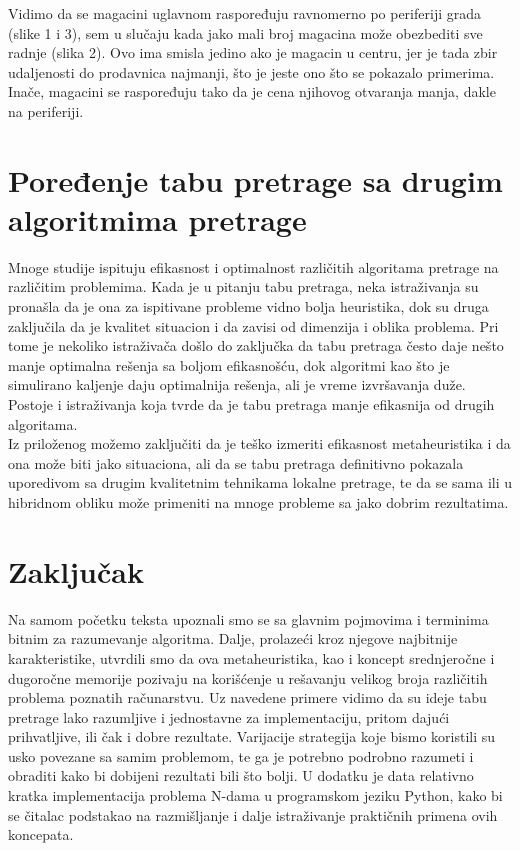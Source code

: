 \documentclass[a4paper]{article}
\begin{document}
Vidimo da se magacini uglavnom raspoređuju ravnomerno po periferiji grada (slike 1 i 3), sem u slučaju kada jako mali broj magacina može obezbediti sve radnje (slika 2). Ovo ima smisla jedino ako je magacin u centru, jer je tada zbir udaljenosti do prodavnica najmanji, što je jeste ono što se pokazalo primerima. Inače, magacini se raspoređuju tako da je cena njihovog otvaranja manja, dakle na periferiji.

\section{Poređenje tabu pretrage sa drugim algoritmima pretrage}
Mnoge studije ispituju efikasnost i optimalnost različitih algoritama pretrage na različitim problemima. Kada je u pitanju tabu pretraga, neka istraživanja su pronašla da je ona za ispitivane probleme vidno bolja heuristika, \cite{comptabubetter} dok su druga zaključila da je kvalitet situacion i da zavisi od dimenzija i oblika problema. \cite{comptabusimilar}\cite{comptabugoodperformance} Pri tome je nekoliko istraživača došlo do zaključka da tabu pretraga često daje nešto manje optimalna rešenja sa boljom efikasnošću, dok algoritmi kao što je simulirano kaljenje daju optimalnija rešenja, ali je vreme izvršavanja duže. \cite{comptabubettertimeworseresult} Postoje i istraživanja koja tvrde da je tabu pretraga manje efikasnija od drugih algoritama. \cite{comptabuworse}\\

Iz priloženog možemo zaključiti da je teško izmeriti efikasnost metaheuristika i da ona može biti jako situaciona, ali da se tabu pretraga definitivno pokazala uporedivom sa drugim kvalitetnim tehnikama lokalne pretrage, te da se sama ili u hibridnom obliku može primeniti na mnoge probleme sa jako dobrim rezultatima.

\newpage

\section{Zaključak}
Na samom početku teksta upoznali smo se sa glavnim pojmovima i terminima bitnim za razumevanje algoritma. Dalje, prolazeći kroz njegove najbitnije karakteristike, utvrdili smo da ova metaheuristika, kao i koncept srednjeročne i dugoročne memorije pozivaju na korišćenje u rešavanju velikog broja različitih problema poznatih računarstvu. Uz navedene primere vidimo da su ideje tabu pretrage lako razumljive i jednostavne za implementaciju, pritom dajući prihvatljive, ili čak i dobre rezultate. Varijacije strategija koje bismo koristili su usko povezane sa samim problemom, te ga je potrebno podrobno razumeti i obraditi kako bi dobijeni rezultati bili što bolji. U dodatku je data relativno kratka implementacija problema N-dama u programskom jeziku Python, kako bi se čitalac podstakao na razmišljanje i dalje istraživanje praktičnih primena ovih koncepata.
\end{document}
